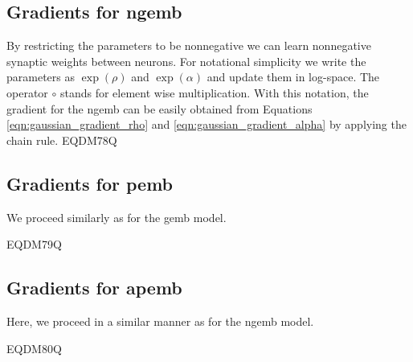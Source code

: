 \documentclass[12pt]{article}
\begin{document}
\subsection{Gradients for \gls{ngemb}}
 \label{sec:lognormal_gradients}
By restricting the parameters to be nonnegative we can learn nonnegative synaptic weights between neurons.
For notational simplicity we write the parameters as $\exp(\rho)$ and $\exp(\alpha)$ and update them in log-space. The operator $\circ$ stands for element wise multiplication. With this notation, the gradient for the \gls{ngemb} can be easily obtained from Equations \ref{eqn:gaussian_gradient_rho} and \ref{eqn:gaussian_gradient_alpha} by applying the chain rule.
EQDM78Q

\subsection{Gradients for \gls{pemb}}
\label{sec:poisson_gradients} 

We proceed similarly as for the \gls{gemb} model.

EQDM79Q

\subsection{Gradients for \gls{apemb}}
\label{sec:additive_poisson_gradients} 

Here, we proceed in a similar manner as for the \gls{ngemb} model.

EQDM80Q
\end{document}
